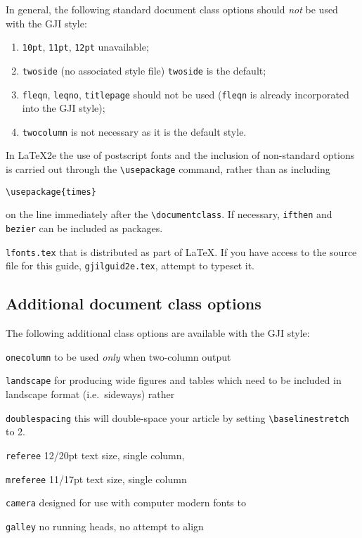 In general, the following standard document class options should {\em not\/} be
used with the GJI style:
\begin{enumerate}
  \item \texttt{10pt}, \texttt{11pt}, \texttt{12pt} \textendash{} unavailable;
  \item \texttt{twoside} (no associated style file) \textendash{}
     \texttt{twoside} is the default;
   \item \texttt{fleqn}, \texttt{leqno}, \texttt{titlepage} \textendash{} should
     not be used (\verb"fleqn" is already incorporated into the GJI style);
  \item \texttt{twocolumn} \textendash{} is not necessary as it is the default
    style.
\end{enumerate}

In \LaTeX2e the use of postscript fonts and the inclusion of non-standard
options is carried out through the \verb"\usepackage" command, rather than as
including
\begin{verbatim}
\usepackage{times}
\end{verbatim}
on the line immediately after the \verb"\documentclass". If necessary,
\texttt{ifthen} and \texttt{bezier} can be included as packages.

\verb"lfonts.tex" that is distributed as part of \LaTeX. If you have access to
the source file for this guide, \verb"gjilguid2e.tex", attempt to typeset it.

\subsection{Additional document class options}\label{classoptions}

The following additional class options are available with the GJI style:
\begin{description}
  \item \texttt{onecolumn} \textendash{} to be used \textit{only} when two-column output
  \item \texttt{landscape} \textendash{} for producing wide figures and tables which
        need to be included in landscape format (i.e.\ sideways) rather
  \item \texttt{doublespacing} \textendash{} this will double-space your
        article by setting \verb"\baselinestretch" to 2.
  \item \texttt{referee} \textendash{} 12/20pt text size, single column,
  \item \texttt{mreferee} \textendash{} 11/17pt text size, single column
  \item \texttt{camera} \textendash{} designed for use with computer modern fonts to
  \item \texttt{galley} \textendash{} no running heads, no attempt to align
\end{description}


